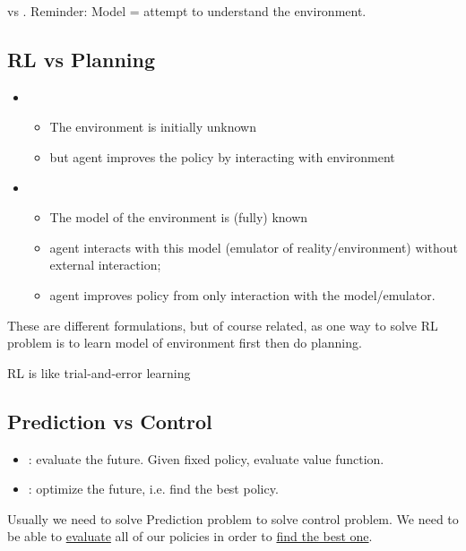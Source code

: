  vs . Reminder: Model = attempt to understand the environment.

\subsection{RL vs Planning}
\begin{itemize}
	\item {}
	\begin{itemize}
		\item The environment is initially unknown
		\item but agent improves the policy by interacting with environment
	\end{itemize}
	\item {}
	\begin{itemize}
		\item The model of the environment is (fully) known
		\item agent interacts with this model (emulator of reality/environment) without external interaction;
		\item agent improves policy from only interaction with the model/emulator.
	\end{itemize}
\end{itemize}

These are different formulations, but of course related, as one way to solve RL problem is to learn model of environment first then do planning.

RL is like trial-and-error learning 

\subsection{Prediction vs Control}
\begin{itemize}
	\item {}: evaluate the future. Given fixed policy, evaluate value function.
	\item {}: optimize the future, i.e. find the best policy.
\end{itemize}

Usually we need to solve Prediction problem to solve control problem. We need to be able to \underline{evaluate} all of our policies in order to \underline{find the best one}.
